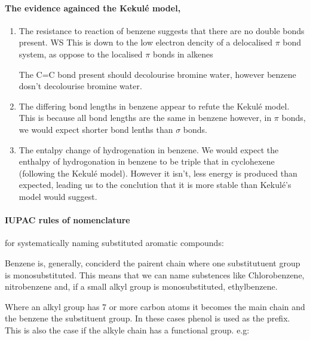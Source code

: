 	\paragraph{The evidence againced the Kekul\'{e} model,}
	\begin{enumerate}
		\item The resistance to reaction of benzene suggests that there are no double bonds present.
		WS
	    This is down to the low electron dencity of a delocalised $\pi$ bond system, as oppose to the localised $\pi$ bonds in alkenes
		
		The C=C bond present should decolourise bromine water, however benzene dosn't decolourise bromine water.
		
		\item  The differing bond lengths in benzene appear to refute the Kekul\'{e} model.
		This is because all bond lengths are the same in benzene however, in $\pi$ bonds, we would expect shorter bond lenths than $\sigma$ bonds.
		
		\item The entalpy change of hydrogenation in benzene. 
		We would expect the enthalpy of hydrogonation in benzene to be triple that in cyclohexene (following the Kekul\'{e} model).
		However it isn't, less energy is produced than expected, leading us to the conclution that it is more stable than Kekul\'{e}'s model would suggest.
	\end{enumerate}
	
	\paragraph{IUPAC rules of nomenclature}  for systematically naming substituted aromatic compounds:
	
	Benzene is, generally, conciderd the pairent chain where one substitutuent group is monosubstituted. 
	This means that we can name substences like Chlorobenzene, nitrobenzene and, if a small alkyl group is monosubstituted, ethylbenzene.
	
	Where an alkyl group has 7 or more carbon atoms it becomes the main chain and the benzene the substituent group. In these cases phenol is used as the prefix. This is also the case if the alkyle chain has a functional group. e.g:
	\begin{center}
	    \hspace{2cm}
	    \hspace{1.5cm}

        \vspace{2cm}	
	\end{center}
	
